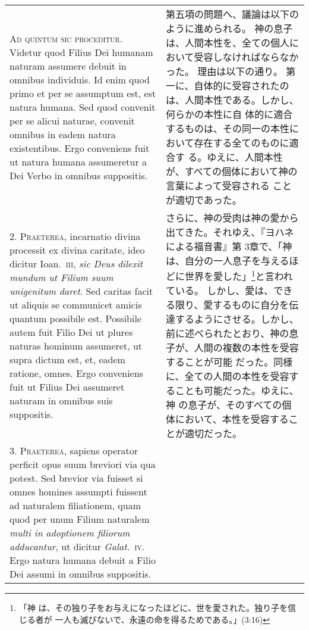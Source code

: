 \documentclass[10pt]{jsarticle} %
\begin{document}
\begin{longtable}{p{21em}p{21em}}

{\Huge A}{\scshape d quintum sic proceditur}. Videtur quod Filius Dei humanam naturam
assumere debuit in omnibus individuis. Id enim quod primo et per se
assumptum est, est natura humana. Sed quod convenit per se alicui
naturae, convenit omnibus in eadem natura existentibus. Ergo conveniens
fuit ut natura humana assumeretur a Dei Verbo in omnibus suppositis.


&

第五項の問題へ、議論は以下のように進められる。
神の息子は、人間本性を、全ての個人において受容しなければならなかった。
理由は以下の通り。
第一に、自体的に受容されたのは、人間本性である。しかし、何らかの本性に自
 体的に適合するものは、その同一の本性において存在する全てのものに適合す
 る。ゆえに、人間本性が、すべての個体において神の言葉によって受容される
 ことが適切であった。

\\



2. {\scshape Praeterea}, incarnatio divina processit ex divina caritate, ideo dicitur
Ioan.~{\scshape iii}, {\itshape sic Deus dilexit mundum ut Filium suum unigenitum daret}. Sed
caritas facit ut aliquis se communicet amicis quantum possibile
est. Possibile autem fuit Filio Dei ut plures naturas hominum assumeret,
ut supra dictum est, et, eadem ratione, omnes. Ergo conveniens fuit ut
Filius Dei assumeret naturam in omnibus suis suppositis.


&


さらに、神の受肉は神の愛から出てきた。それゆえ、『ヨハネによる福音書』第
 3章で、「神は、自分の一人息子を与えるほどに世界を愛した」\footnote{「神
 は、その独り子をお与えになったほどに、世を愛された。独り子を信じる者が
 一人も滅びないで、永遠の命を得るためである。」(3:16)}と言われている。
しかし、愛は、できる限り、愛するものに自分を伝達するようにさせる。しかし、
 前に述べられたとおり、神の息子が、人間の複数の本性を受容することが可能
 だった。同様に、全ての人間の本性を受容することも可能だった。ゆえに、神
 の息子が、そのすべての個体において、本性を受容することが適切だった。

\\



3. {\scshape Praeterea}, sapiens operator perficit opus suum breviori via qua
potest. Sed brevior via fuisset si omnes homines assumpti fuissent ad
naturalem filiationem, quam quod per unum Filium naturalem {\itshape multi in
adoptionem filiorum adducantur}, ut dicitur {\itshape Galat.}~{\scshape iv}. Ergo natura humana
debuit a Filio Dei assumi in omnibus suppositis.



\end{longtable}
\end{document}
